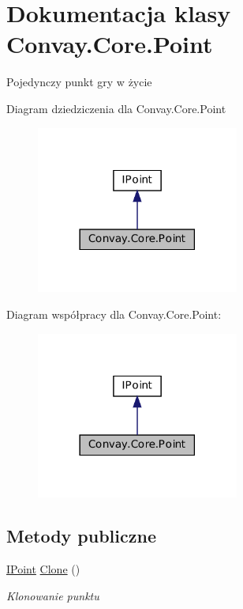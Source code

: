 \hypertarget{class_convay_1_1_core_1_1_point}{}\section{Dokumentacja klasy Convay.\+Core.\+Point}
\label{class_convay_1_1_core_1_1_point}


Pojedynczy punkt gry w życie  




Diagram dziedziczenia dla Convay.\+Core.\+Point
\nopagebreak
\begin{figure}[H]
\begin{center}
\leavevmode
\includegraphics[width=189pt]{class_convay_1_1_core_1_1_point__inherit__graph}
\end{center}
\end{figure}


Diagram współpracy dla Convay.\+Core.\+Point\+:
\nopagebreak
\begin{figure}[H]
\begin{center}
\leavevmode
\includegraphics[width=189pt]{class_convay_1_1_core_1_1_point__coll__graph}
\end{center}
\end{figure}
\subsection*{Metody publiczne}
\begin{DoxyCompactItemize}
\item 
\hyperlink{interface_convay_1_1_core_1_1_interfaces_1_1_i_point}{I\+Point} \hyperlink{class_convay_1_1_core_1_1_point_a17444c52db4dd474a88abfd2a8d57e6d}{Clone} ()
\begin{DoxyCompactList}\small\item\em Klonowanie punktu \end{DoxyCompactList}\end{DoxyCompactItemize}
